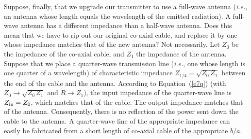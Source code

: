 Suppose, finally, that we upgrade our transmitter  to use a full-wave antenna
({\em i.e.}, an antenna whose length equals the wavelength of the emitted radiation).
A full-wave antenna has a different impedance than a half-wave antenna. Does
this mean that we have to rip out our original co-axial cable, and replace it
by one whose impedance matches that of the new antenna? Not necessarily.
Let $Z_0$ be the impedance of the co-axial cable, and $Z_1$ the impedance of
the antenna. Suppose that we place a quarter-wave transmission line ({\em i.e.}, one whose
length is one quarter of a wavelength) of characteristic
impedance $Z_{1/4} = \sqrt{Z_0 \,Z_1}$ between the end of the cable and the
antenna. According to Equation~(\ref{e7q}) (with $Z_0 \rightarrow  \sqrt{Z_0 \,Z_1}$
and $R\rightarrow Z_1$), the input impedance of the quarter-wave line
is $Z_{\rm in} = Z_0$, which matches that of the cable. The output impedance
matches that of the antenna. Consequently, there is no reflection of the power
sent down the cable to the antenna. A quarter-wave line of the appropriate impedance
can easily
 be fabricated from a short length of co-axial cable of the appropriate $b/a$. 

